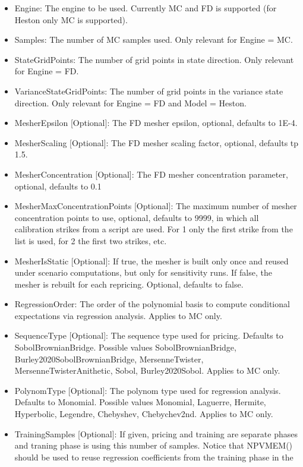 \begin{itemize}
\item Engine: The engine to be used. Currently MC and FD is supported (for Heston only MC is supported).
\item Samples: The number of MC samples used. Only relevant for Engine = MC.
\item StateGridPoints: The number of grid points in state direction. Only relevant for Engine = FD.
\item VarianceStateGridPoints: The number of grid points in the variance state direction. Only relevant for Engine = FD and Model = Heston.
\item MesherEpsilon [Optional]: The FD mesher epsilon, optional, defaults to 1E-4.
\item MesherScaling [Optional]: The FD mesher scaling factor, optional, defaults tp 1.5.
\item MesherConcentration [Optional]: The FD mesher concentration parameter, optional, defaults to 0.1
\item MesherMaxConcentrationPoints [Optional]: The maximum number of mesher concentration points to use, optional,
  defaults to 9999, in which all calibration strikes from a script are used. For 1 only the first strike from the list
  is used, for 2 the first two strikes, etc.
\item MesherIsStatic [Optional]: If true, the mesher is built only once and reused under scenario computations, but only
  for sensitivity runs. If false, the mesher is rebuilt for each repricing. Optional, defaults to false.
\item RegressionOrder: The order of the polynomial basis to compute conditional expectations via regression
  analysis. Applies to MC only.
\item SequenceType [Optional]: The sequence type used for pricing. Defaults to SobolBrownianBridge. Possible values
  SobolBrownianBridge, Burley2020\-Sobol\-Brownian\-Bridge, MersenneTwister, MersenneTwisterAnithetic, Sobol,
  Burley2020Sobol. Applies to MC only.
\item PolynomType [Optional]: The polynom type used for regression analysis. Defaults to Monomial. Possible values
  Monomial, Laguerre, Hermite, Hyperbolic, Legendre, Chebyshev, Chebychev2nd. Applies to MC only.
\item TrainingSamples [Optional]: If given, pricing and training are separate phases and traning phase is using this
  number of samples. Notice that NPVMEM() should be used to reuse regression coefficients from the training phase in the

\end{itemize}
